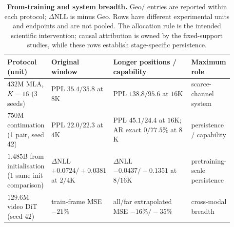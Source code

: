 \begin{table}[t]
\centering
\footnotesize
\setlength{\tabcolsep}{2.0pt}
\renewcommand{\arraystretch}{1.02}
\caption{\textbf{From-training and system breadth.} Geo/\evq{} entries are
reported within each protocol; $\Delta$NLL is \evq{} minus Geo. Rows have
different experimental units and endpoints and are not pooled. The allocation
rule is the intended scientific intervention; causal attribution is owned by
the fixed-support studies, while these rows establish stage-specific
persistence.}
\label{tab:allocation-routes}
\begin{tabular}{@{}p{0.18\linewidth}p{0.18\linewidth}p{0.40\linewidth}p{0.16\linewidth}@{}}
\toprule
Protocol (unit) & Original window & Longer positions / capability & Maximum role \\
\midrule
$432$M MLA, $K{=}16$ (3 seeds)
  & PPL $35.4/35.8$ at $8$K
  & PPL $138.8/95.6$ at $16$K & scarce-channel system \\
$750$M continuation (1 pair, seed 42)
  & PPL $22.0/22.3$ at $4$K
  & PPL $45.1/24.4$ at $16$K; AR exact $0/77.5\%$ at $8$K
  & persistence / capability \\
$1.485$B from initialisation (1 same-init comparison)
  & $\Delta$NLL $+0.0724/+0.0381$ at $2/4$K
  & $\Delta$NLL $-0.0437/-0.1351$ at $8/16$K
  & pretraining-scale persistence \\
$129.6$M video DiT (seed 42)
  & train-frame MSE $-21\%$
  & all/far extrapolated MSE $-16\%/-35\%$
  & cross-modal breadth \\
\bottomrule
\end{tabular}
\end{table}
